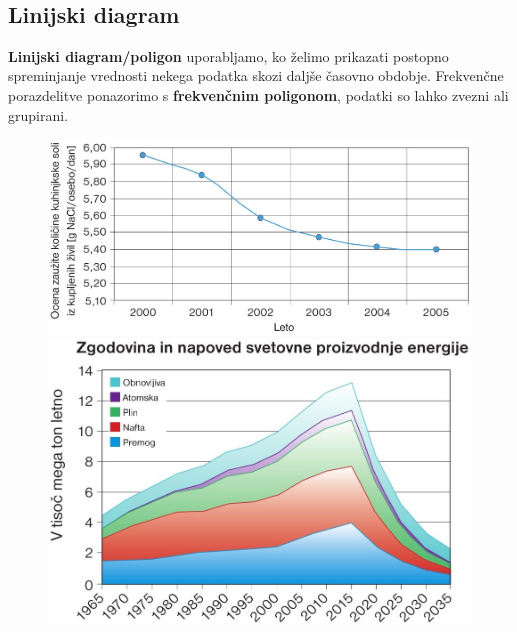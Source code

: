         ~

        \subsection*{Linijski diagram}

            \textbf{Linijski diagram/poligon} uporabljamo, ko želimo prikazati postopno spreminjanje vrednosti nekega podatka skozi daljše časovno obdobje.
            Frekvenčne porazdelitve ponazorimo s \textbf{frekvenčnim poligonom}, podatki so lahko zvezni ali grupirani.
                
                    \begin{figure}[H]
                        \includegraphics[scale=0.23]{../Slike_in_skice/1166.jpg}
                        \includegraphics[scale=0.3]{../Slike_in_skice/1099.jpg}
                    \end{figure}
                    

        ~\\~



